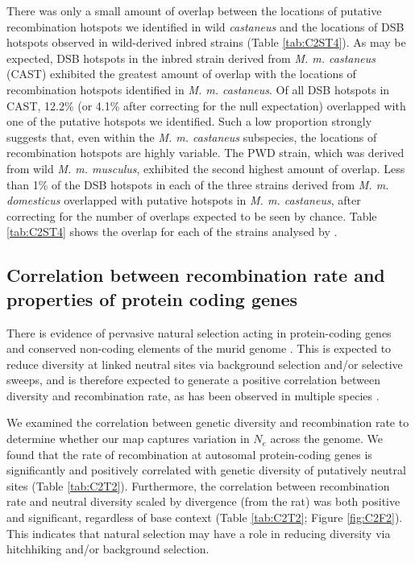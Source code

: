 There was only a small amount of overlap between the locations of putative recombination hotspots we identified in wild \textit{castaneus} and the locations of DSB hotspots observed in wild-derived inbred strains \citep{RN249} (Table \ref{tab:C2ST4}). As may be expected, DSB hotspots in the inbred strain derived from \textit{M. m. castaneus} (CAST) exhibited the greatest amount of overlap with the locations of recombination hotspots identified in \textit{M. m. castaneus}. Of all DSB hotspots in CAST, 12.2\% (or 4.1\% after correcting for the null expectation) overlapped with one of the putative hotspots we identified. Such a low proportion strongly suggests that, even within the \textit{M. m. castaneus} subspecies, the locations of recombination hotspots are highly variable. The PWD strain, which was derived from wild \textit{M. m. musculus}, exhibited the second highest amount of overlap. Less than 1\% of the DSB hotspots in each of the three strains derived from \textit{M. m. domesticus} overlapped with putative hotspots in \textit{M. m. castaneus}, after correcting for the number of overlaps expected to be seen by chance. Table \ref{tab:C2ST4} shows the overlap for each of the strains analysed by \cite{RN249}.

\subsection{Correlation between recombination rate and properties of protein coding genes}

	There is evidence of pervasive natural selection acting in protein-coding genes and conserved non-coding elements of the murid genome \citep{RN158, RN170, RN122}. This is expected to reduce diversity at linked neutral sites via background selection and/or selective sweeps, and is therefore expected to generate a positive correlation between diversity and recombination rate, as has been observed in multiple species \citep{RN117}. 

	We examined the correlation between genetic diversity and recombination rate to determine whether our map captures variation in $N_e$ across the genome. We found that the rate of recombination at autosomal protein-coding genes is significantly and positively correlated with genetic diversity of putatively neutral sites (Table \ref{tab:C2T2}). Furthermore, the correlation between recombination rate and neutral diversity scaled by divergence (from the rat) was both positive and significant, regardless of base context (Table \ref{tab:C2T2}; Figure \ref{fig:C2F2}). This indicates that natural selection may have a role in reducing diversity via hitchhiking and/or background selection.

